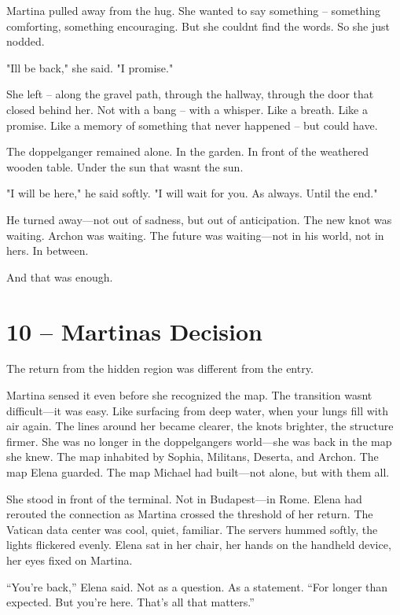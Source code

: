 \documentclass[
]{article}
\begin{document}
Martina pulled away from the hug. She wanted to say something -- something comforting, something encouraging. But she couldn\textquotesingle t find the words. So she just nodded.

"I\textquotesingle ll be back," she said. "I promise."

She left -- along the gravel path, through the hallway, through the door that closed behind her. Not with a bang -- with a whisper. Like a breath. Like a promise. Like a memory of something that never happened -- but could have.

The doppelganger remained alone. In the garden. In front of the weathered wooden table. Under the sun that wasn\textquotesingle t the sun.

"I will be here," he said softly. "I will wait for you. As always. Until the end."

He turned away---not out of sadness, but out of anticipation. The new knot was waiting. Archon was waiting. The future was waiting---not in his world, not in hers. In between.

And that was enough.

\section{10 -- Martina\textquotesingle s Decision}\label{martinas-decision}

The return from the hidden region was different from the entry.

Martina sensed it even before she recognized the map. The transition wasn\textquotesingle t difficult---it was easy. Like surfacing from deep water, when your lungs fill with air again. The lines around her became clearer, the knots brighter, the structure firmer. She was no longer in the doppelganger\textquotesingle s world---she was back in the map she knew. The map inhabited by Sophia, Militans, Deserta, and Archon. The map Elena guarded. The map Michael had built---not alone, but with them all.

She stood in front of the terminal. Not in Budapest---in Rome. Elena had rerouted the connection as Martina crossed the threshold of her return. The Vatican data center was cool, quiet, familiar. The servers hummed softly, the lights flickered evenly. Elena sat in her chair, her hands on the handheld device, her eyes fixed on Martina.

``You're back,'' Elena said. Not as a question. As a statement. ``For longer than expected. But you're here. That's all that matters.''
\end{document}
